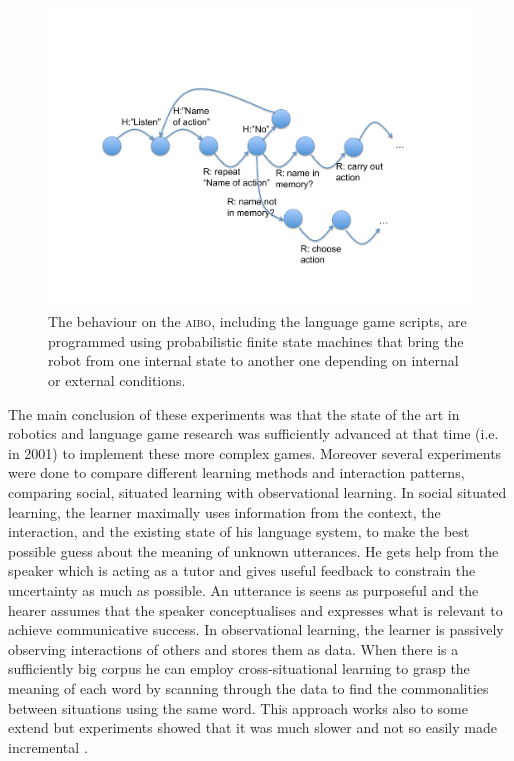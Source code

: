 \begin{figure}[htbp]
  \centerline{\includegraphics[width=.70\textwidth]{chap10/figs/fsm.pdf}}
\caption{\label{fig:fsm}The behaviour on the \textsc{aibo}, including the language game scripts, are programmed using probabilistic finite state 
machines that bring the robot from one internal state to another one depending on internal or external conditions.}
\end{figure}

The main conclusion of these experiments was that the state of the art in robotics and language
game research was sufficiently advanced at that time (i.e. in 
2001) to implement these more complex games. Moreover several experiments were done to compare
different learning methods and interaction patterns, comparing social, situated learning with 
observational learning. In social situated learning, 
the learner maximally uses information from the context, the 
interaction, and the existing state of his language system, to make the best possible guess about the meaning of 
unknown utterances. He gets help from the speaker which is acting as a tutor and gives useful feedback to constrain 
the uncertainty as much as possible. An utterance is seens as purposeful and the hearer assumes that the speaker conceptualises
and expresses what is relevant to achieve communicative success. In observational learning, the learner is 
passively observing interactions of others and stores them as data. When there is a sufficiently big 
corpus he can employ cross-situational learning to grasp the meaning of each word by scanning 
through the data to find the commonalities between 
situations using the same word. This approach works also to some extend but experiments showed that it was much slower and 
not so easily made incremental \citep{DeBeule:2006}. 

